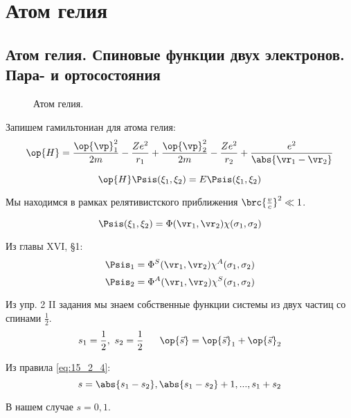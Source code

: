 \chapter{Атом гелия}

\section{Атом гелия. Спиновые функции двух электронов. Пара- и ортосостояния}

\begin{figure}[h!]
\centering
{}
\caption{Атом гелия.} \label{fig:17_1}
\end{figure}


Запишем гамильтониан для атома гелия:
\begin{equation}
\label{eq:17_1_1}
\op{H} = \frac{\op{\vp}_1^2}{2m} - \frac{Ze^2}{r_1} + \frac{\op{\vp}_2^2}{2m} - \frac{Ze^2}{r_2} + \frac{e^2}{\abs{\vr_1 - \vr_2}}
\end{equation}

\begin{equation}
\label{eq:17_1_2}
\op{H} \Psis(\xi_1, \xi_2) =E\Psis(\xi_1, \xi_2)
\end{equation}

Мы находимся в рамках релятивистского приближения $\brc{\frac{v}{c}}^2 \ll 1$.

$$
\Psis(\xi_1, \xi_2) = \Phi(\vr_1, \vr_2) \chi(\sigma_1, \sigma_2)
$$

Из главы XVI, \S1:
$$
\Psis_1 = \Phi^S(\vr_1, \vr_2) \chi^A(\sigma_1, \sigma_2)
$$
$$
\Psis_2 = \Phi^A(\vr_1, \vr_2) \chi^S(\sigma_1, \sigma_2)
$$

Из упр. 2 II задания мы знаем собственные функции системы из двух частиц со спинами $\frac{1}{2}$.
$$
s_1=\frac{1}{2}, ~ s_2=\frac{1}{2}~~~~~\op{\vec{s}} = \op{\vec{s}} _1 + \op{\vec{s}}_2
$$

Из правила \eqref{eq:15_2_4}:
$$
s = \abs{s_1 - s_2}, \abs{s_1 - s_2} + 1, ..., s_1+s_2 
$$

В нашем случае $s = 0, 1$.

